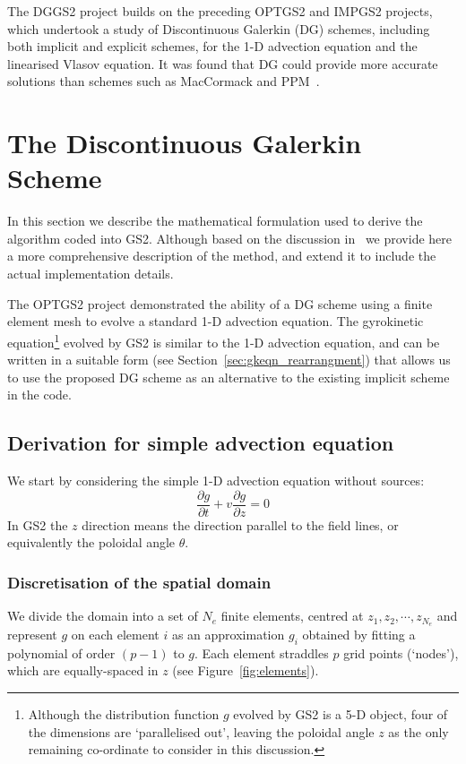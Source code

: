 \documentclass[10pt,a4paper]{article}
\newcommand{\dd}{\partial}
\begin{document}
The DGGS2 project builds on the preceding OPTGS2 and IMPGS2 projects, which
undertook a study of Discontinuous Galerkin (DG) schemes, including both
implicit and explicit schemes, for the 1-D advection equation and the
linearised Vlasov equation. It was found that DG could provide more accurate
solutions than schemes such as MacCormack and PPM~\cite{hammer}.

\section{The Discontinuous Galerkin Scheme}
\label{sec:dgscheme}

In this section we describe the mathematical formulation used to derive the
algorithm coded into GS2. Although based on the discussion in~\cite{hammer} we
provide here a more comprehensive description of the method, and extend it to
include the actual implementation details.

The OPTGS2 project demonstrated the ability of a DG scheme using a finite
element mesh to evolve a standard 1-D advection equation. The gyrokinetic
equation\footnote{Although the distribution function $g$ evolved by GS2 is a
  5-D object, four of the dimensions are `parallelised out', leaving the
  poloidal angle $z$ as the only remaining co-ordinate to consider in this
  discussion.} evolved by GS2 is similar to the 1-D advection equation, and
can be written in a suitable form (see Section~\ref{sec:gkeqn_rearrangment})
that allows us to use the proposed DG scheme as an alternative to the existing
implicit scheme in the code.

\subsection{Derivation for simple advection equation}

We start by considering the simple 1-D advection equation without sources:
\begin{equation}
\frac{\dd g}{\dd t} + v \frac{\dd g}{\dd z} = 0
\label{eqn:basicadvection}
\end{equation}
In GS2 the $z$ direction means the direction parallel to the field lines, or
equivalently the poloidal angle $\theta$.

\subsubsection{Discretisation of the spatial domain}

We divide the domain into a set of $N_e$ finite elements, centred at $z_1, z_2,
\cdots , z_{N_e}$ and represent $g$ on each element $i$ as an approximation $g_i$
obtained by fitting a polynomial of order $(p-1)$ to $g$. Each element
straddles $p$ grid points (`nodes'), which are equally-spaced in $z$ (see
Figure~\ref{fig:elements}).
\end{document}
